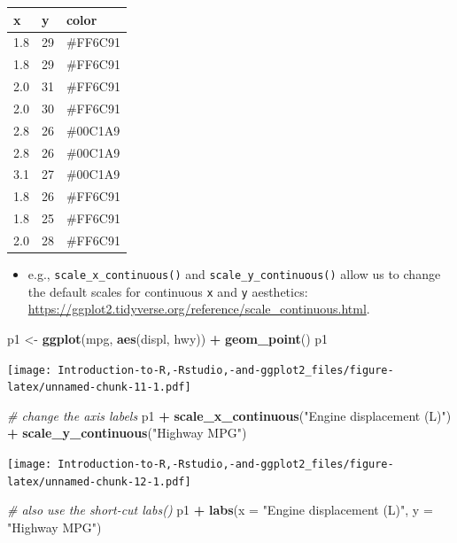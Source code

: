 \documentclass[]{book}
\newenvironment{Shaded}{\begin{snugshade}}{\end{snugshade}}
\newcommand{\CommentTok}[1]{\textcolor[rgb]{0.56,0.35,0.01}{\textit{#1}}}
\newcommand{\DataTypeTok}[1]{\textcolor[rgb]{0.13,0.29,0.53}{#1}}
\newcommand{\KeywordTok}[1]{\textcolor[rgb]{0.13,0.29,0.53}{\textbf{#1}}}
\newcommand{\NormalTok}[1]{#1}
\newcommand{\OperatorTok}[1]{\textcolor[rgb]{0.81,0.36,0.00}{\textbf{#1}}}
\newcommand{\StringTok}[1]{\textcolor[rgb]{0.31,0.60,0.02}{#1}}
\providecommand{\tightlist}{%
  \setlength{\itemsep}{0pt}\setlength{\parskip}{0pt}}
\begin{document}
\begin{longtable}[]{@{}lll@{}}
\toprule
x & y & color\tabularnewline
\midrule
\endhead
1.8 & 29 & \#FF6C91\tabularnewline
1.8 & 29 & \#FF6C91\tabularnewline
2.0 & 31 & \#FF6C91\tabularnewline
2.0 & 30 & \#FF6C91\tabularnewline
2.8 & 26 & \#00C1A9\tabularnewline
2.8 & 26 & \#00C1A9\tabularnewline
3.1 & 27 & \#00C1A9\tabularnewline
1.8 & 26 & \#FF6C91\tabularnewline
1.8 & 25 & \#FF6C91\tabularnewline
2.0 & 28 & \#FF6C91\tabularnewline
\bottomrule
\end{longtable}

\begin{itemize}
\tightlist
\item
  e.g., \texttt{scale\_x\_continuous()} and \texttt{scale\_y\_continuous()} allow us to change the default scales for continuous \texttt{x} and \texttt{y} aesthetics: \url{https://ggplot2.tidyverse.org/reference/scale_continuous.html}.
\end{itemize}

\begin{Shaded}
\begin{Highlighting}[]
\NormalTok{p1 <-}\StringTok{ }\KeywordTok{ggplot}\NormalTok{(mpg, }\KeywordTok{aes}\NormalTok{(displ, hwy)) }\OperatorTok{+}\StringTok{ }\KeywordTok{geom_point}\NormalTok{()}
\NormalTok{p1}
\end{Highlighting}
\end{Shaded}

\texttt{[image: Introduction-to-R,-Rstudio,-and-ggplot2\_files/figure-latex/unnamed-chunk-11-1.pdf]}

\begin{Shaded}
\begin{Highlighting}[]
\CommentTok{# change the axis labels}
\NormalTok{p1 }\OperatorTok{+}\StringTok{ }\KeywordTok{scale_x_continuous}\NormalTok{(}\StringTok{"Engine displacement (L)"}\NormalTok{) }\OperatorTok{+}
\StringTok{  }\KeywordTok{scale_y_continuous}\NormalTok{(}\StringTok{"Highway MPG"}\NormalTok{)}
\end{Highlighting}
\end{Shaded}

\texttt{[image: Introduction-to-R,-Rstudio,-and-ggplot2\_files/figure-latex/unnamed-chunk-12-1.pdf]}

\begin{Shaded}
\begin{Highlighting}[]
\CommentTok{# also use the short-cut labs()}
\NormalTok{p1 }\OperatorTok{+}\StringTok{ }\KeywordTok{labs}\NormalTok{(}\DataTypeTok{x =} \StringTok{"Engine displacement (L)"}\NormalTok{, }\DataTypeTok{y =} \StringTok{"Highway MPG"}\NormalTok{)}
\end{Highlighting}
\end{Shaded}
\end{document}
